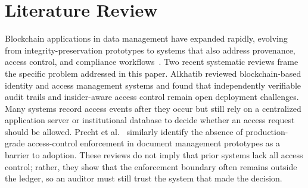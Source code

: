 \documentclass[preprint,12pt]{elsarticle}
\begin{document}
\section{Literature Review}
\label{sec:literature_review}

Blockchain applications in data management have expanded rapidly, evolving from integrity-preservation prototypes to systems that also address provenance, access control, and compliance
workflows~\cite{jaoude2019blockchain,casino2019systematic}. Two recent systematic reviews frame the specific problem addressed in this paper. Alkhatib \cite{alkhatib2022towards} reviewed blockchain-based identity and access management systems and found that independently verifiable audit trails and insider-aware access control remain open deployment challenges. Many systems record access events after they occur but still rely on a centralized application server or institutional database to decide whether an access request should be allowed. Precht et al.~\cite{paperlessEverything2025} similarly identify the absence of production-grade access-control enforcement in document management prototypes as a barrier to adoption. These reviews do not
imply that prior systems lack all access control; rather, they show
that the enforcement boundary often remains outside the ledger, so an
auditor must still trust the system that made the decision.
\begingroup
\scriptsize
\renewcommand{\arraystretch}{1.18}
\setlength{\tabcolsep}{4pt}
\end{document}
